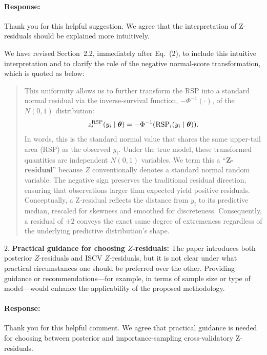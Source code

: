 \documentclass[11pt]{article}
\newcommand*{\mybox}[2]{%
  \par\medskip\noindent
  \colorbox{#1!30}{\parbox{.98\linewidth}{#2}}%
  \par\medskip
}
\begin{document}
\paragraph{Response:}
Thank you for this helpful suggestion. We agree that the interpretation of Z-residuals should be explained more intuitively.

We have revised Section~2.2, immediately after Eq.~(2), to include this intuitive interpretation and to clarify the role of the negative normal-score transformation, which is quoted as below:

\begin{quote}

This uniformity allows us to further transform the RSP into a standard normal residual via the inverse-survival function, $-\Phi^{-1}(\cdot)$, of the $N(0,1)$ distribution:
\begin{equation}\label{eq:z_residual_definition}
z_i^{\text{RSP}} (y_i \mid \bm{\theta}) = -\Phi^{-1}(\text{RSP}_i(y_i \mid \bm{\theta})).
\end{equation}
In words, this is the standard normal value that shares the same upper-tail area (RSP) as the observed $y_i$. Under the true model, these transformed quantities are independent $N(0,1)$ variables. We term this a ``\textbf{Z-residual}'' because $Z$ conventionally denotes a standard normal random variable. The negative sign preserves the traditional residual direction, ensuring that observations larger than expected yield positive residuals. Conceptually, a Z-residual reflects the distance from $y_i$ to its predictive median, rescaled for skewness and smoothed for discreteness. Consequently, a residual of $\pm 2$ conveys the exact same degree of extremeness regardless of the underlying predictive distribution's shape.

\end{quote}

\medskip

\mybox{gray}{2. \textbf{Practical guidance for choosing $Z$-residuals:} The paper introduces both posterior $Z$-residuals and ISCV $Z$-residuals, but it is not clear under what practical circumstances one should be preferred over the other. Providing guidance or recommendations---for example, in terms of sample size or type of model---would enhance the applicability of the proposed methodology.}

\paragraph{Response:}
Thank you for this helpful comment. We agree that practical guidance is needed for choosing between posterior and importance-sampling cross-validatory Z-residuals. 
\end{document}
